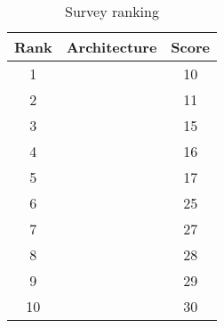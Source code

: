 \begin{table}[h]
    \label{table:survey}
    \centering
    \begin{tabular}{ |c|c|c| }
    \hline
    Rank & Architecture & Score \\
    \hline
    1 & \nameref{fig:architecture3} & 10 \\
    2 & \nameref{fig:architecture8} & 11 \\
    3 & \nameref{fig:architecture6} & 15 \\
    4 & \nameref{fig:architecture10} & 16 \\
    5 & \nameref{fig:architecture2} & 17 \\
    6 & \nameref{fig:architecture1} & 25 \\
    7 & \nameref{fig:architecture5} & 27 \\
    8 & \nameref{fig:architecture7} & 28 \\
    9 & \nameref{fig:architecture9} & 29 \\
    10 & \nameref{fig:architecture4} & 30\\
    \hline
    \end{tabular}
    \caption{Survey ranking}
\end{table}
